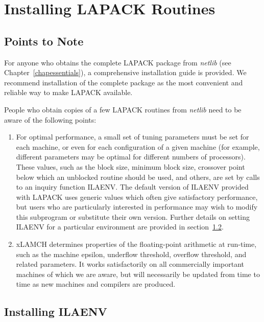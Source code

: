 \chapter{Installing LAPACK Routines}\label{chapinstall}

\section{Points to Note}\label{chapinstallsec1}

For anyone who obtains the complete LAPACK package from {\em netlib}
(see Chapter~\ref{chapessentials}), a
comprehensive installation 
guide is provided. We recommend
installation of the complete package as the most convenient and reliable
way to make LAPACK available.

People who obtain copies of a few LAPACK routines from {\em netlib} need to be
aware of the following points:

\begin{enumerate}

\item 
For optimal performance, a small set of tuning parameters must be set
for each machine, or even for each configuration of a given machine
(for example, different parameters may be optimal for different numbers
of processors).
These values, such as the block size, minimum block size, crossover
point below which an unblocked routine should be used, and others,
are set by calls to an inquiry function ILAENV.
The default version of ILAENV provided with LAPACK uses generic values
which often give satisfactory performance, but
users who are particularly interested in performance may wish to
modify this subprogram or substitute their own version.
Further details on setting ILAENV for a particular environment
are provided in section~\ref{secilaenv}.

\item 
xLAMCH
determines properties of the 
floating-point arithmetic at run-time, such as the machine epsilon,
underflow threshold,
overflow threshold, and related parameters. It works satisfactorily on
all commercially important machines of which we are aware, but will necessarily
be updated from time to time as new machines and compilers are produced.

\end{enumerate}

\section{Installing ILAENV}\label{secilaenv}

